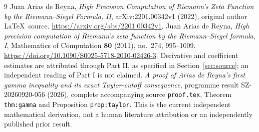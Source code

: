 \documentclass[11pt]{article}
\begin{document}
\begin{thebibliography}{9}
Juan Arias de Reyna,
\emph{High Precision Computation of Riemann's Zeta Function
by the Riemann--Siegel Formula, II}, arXiv:2201.00342v1
(2022), original author \LaTeX\ source.
\url{https://arxiv.org/abs/2201.00342v1}.
Juan Arias de Reyna,
\emph{High precision computation of Riemann's zeta function
by the Riemann--Siegel formula, I}, Mathematics of
Computation \textbf{80} (2011), no.~274, 995--1009.
\url{https://doi.org/10.1090/S0025-5718-2010-02426-3}.
Derivative and coefficient estimates are attributed
through Part II, as specified in Section~\ref{sec:source};
an independent reading of Part I is not claimed.
\emph{A proof of Arias de Reyna's first gamma inequality
and its exact Taylor-cutoff consequence}, programme
result SZ-20260920-056 (2026), complete accompanying
source \texttt{proof.tex}, Theorem \texttt{thm:gamma}
and Proposition \texttt{prop:taylor}. This is the current
independent mathematical derivation, not a human literature
attribution or an independently published prior result.
\end{thebibliography}
\end{document}
